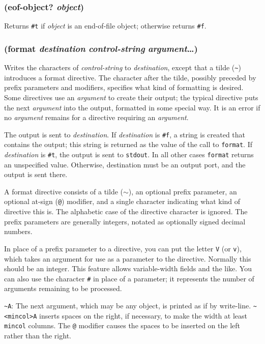 \documentclass{article}
\begin{document}
\subsubsection{(eof-object? \emph{object})}

Returns \verb|#t| if \emph{object} is an end-of-file object; otherwise returns
\verb|#f|.

\subsubsection{(format \emph{destination} \emph{control-string} \emph{argument}\ldots{})}

Writes the characters of \emph{control-string} to \emph{destination}, except that a tilde
(\verb|~|) introduces a format directive. The character after the tilde,
possibly preceded by prefix parameters and modifiers, specifies what kind of formatting is
desired. Some directives use an \emph{argument} to create their output; the typical directive
puts the next \emph{argument} into the output, formatted in some special way. It is an error
if no \emph{argument} remains for a directive requiring an \emph{argument}.

The output is sent to \emph{destination}. If \emph{destination} is \verb|#f|, a string is
created that contains the output; this string is returned as the value of the call to
\verb|format|. If \emph{destination} is \verb|#t|, the output is sent to \verb|stdout|.
In all other cases \verb|format| returns an unspecified value. Otherwise, destination must
be an output port, and the output is sent there.

A format directive consists of a tilde (\ensuremath{\sim}), an optional prefix parameter, an
optional at-sign (\verb|@|) modifier, and a single character indicating what kind of
directive this is. The alphabetic case of the directive character is ignored. The prefix
parameters are generally integers, notated as optionally signed decimal numbers.

In place of a prefix parameter to a directive, you can put the letter \verb|V| (or
\verb|v|), which takes an argument for use as a parameter to the directive. Normally this
should be an integer. This feature allows variable-width fields and the like. You can also use
the character \verb|#| in place of a parameter; it represents the number of arguments
remaining to be processed.

\verb|~A|: The next argument, which may be any object, is printed as if by
write-line. \verb|~<mincol>A| inserts spaces on the right, if necessary, to
make the width at least \verb|mincol| columns. The \verb|@| modifier causes the spaces to be
inserted on the left rather than the right.
\end{document}
